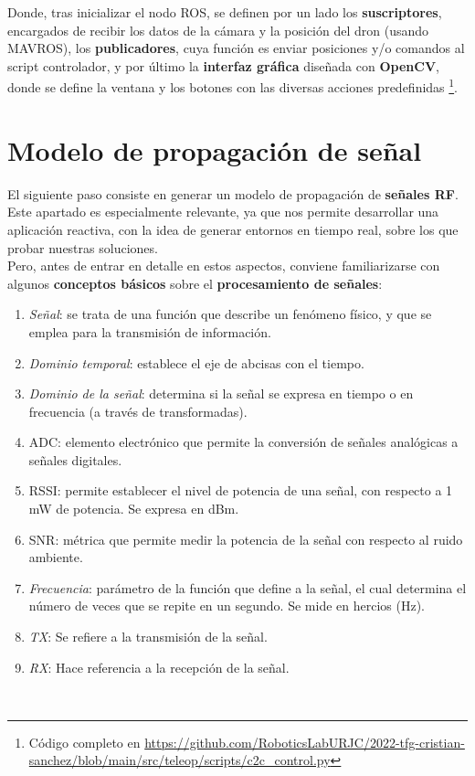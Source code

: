 Donde, tras inicializar el nodo \ac{ROS}, se definen por un lado los \textbf{suscriptores}, encargados de recibir los datos de la cámara y la posición del dron (usando MAVROS), los \textbf{publicadores}, cuya función es enviar posiciones y/o comandos al script controlador, y por último la \textbf{interfaz gráfica} diseñada con \textbf{OpenCV}, donde se define la ventana y los botones con las diversas acciones predefinidas \footnote{Código completo en \url{https://github.com/RoboticsLabURJC/2022-tfg-cristian-sanchez/blob/main/src/teleop/scripts/c2c_control.py}}.\\

\section{Modelo de propagación de señal}
\label{sec:signals}

El siguiente paso consiste en generar un modelo de propagación de \textbf{señales \ac{RF}}. Este apartado es especialmente relevante, ya que nos permite desarrollar una aplicación reactiva, con la idea de generar entornos en tiempo real, sobre los que probar nuestras soluciones.\\

Pero, antes de entrar en detalle en estos aspectos, conviene familiarizarse con algunos \textbf{conceptos básicos} sobre el \textbf{procesamiento de señales}:

\begin{enumerate}
	\item \emph{Señal}: se trata de una función que describe un fenómeno físico, y que se emplea para la transmisión de información.

    \item \emph{Dominio temporal}: establece el eje de abcisas con el tiempo.

    \item \emph{Dominio de la señal}: determina si la señal se expresa en tiempo o en frecuencia (a través de transformadas).

    \item \ac{ADC}: elemento electrónico que permite la conversión de señales analógicas a señales digitales.

    \item \ac{RSSI}: permite establecer el nivel de potencia de una señal, con respecto a 1 mW de potencia. Se expresa en dBm.

    \item \ac{SNR}: métrica que permite medir la potencia de la señal con respecto al ruido ambiente.

    \item \emph{Frecuencia}: parámetro de la función que define a la señal, el cual determina el número de veces que se repite en un segundo. Se mide en hercios (Hz).

    \item \emph{TX}: Se refiere a la transmisión de la señal.

    \item \emph{RX}: Hace referencia a la recepción de la señal.
\end{enumerate} \cite{basics-signals}\\

